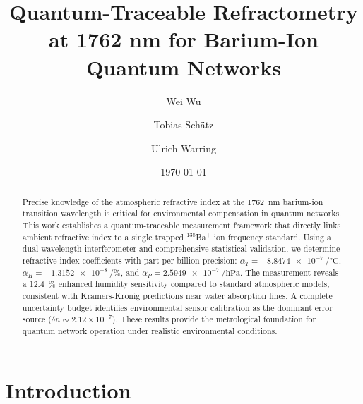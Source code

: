 \documentclass[aps,pra,reprint,groupedaddress,twocolumn,superscriptaddress,linenumbers]{revtex4-2}
\begin{document}

\title{Quantum-Traceable Refractometry at 1762 nm for Barium-Ion Quantum Networks}

\author{Wei Wu}
\author{Tobias Schätz}
\author{Ulrich Warring}

\date{\today}

\begin{abstract}
Precise knowledge of the atmospheric refractive index at the \SI{1762}{\nano\meter} barium-ion transition wavelength is critical for environmental compensation in quantum networks. This work establishes a quantum-traceable measurement framework that directly links ambient refractive index to a single trapped $^{138}$Ba$^+$ ion frequency standard. Using a dual-wavelength interferometer and comprehensive statistical validation, we determine refractive index coefficients with part-per-billion precision: $\alpha_T = \SI{-8.8474e-7}{\per\degreeCelsius}$, $\alpha_H = \SI{-1.3152e-8}{\per\percent}$, and $\alpha_P = \SI{+2.5949e-7}{\per\hecto\pascal}$. The measurement reveals a \SI{12.4}{\percent} enhanced humidity sensitivity compared to standard atmospheric models, consistent with Kramers-Kronig predictions near water absorption lines. A complete uncertainty budget identifies environmental sensor calibration as the dominant error source ($\delta n \sim 2.12\times10^{-7}$). These results provide the metrological foundation for quantum network operation under realistic environmental conditions.
\end{abstract}


\maketitle


\section{Introduction}
\end{document}
